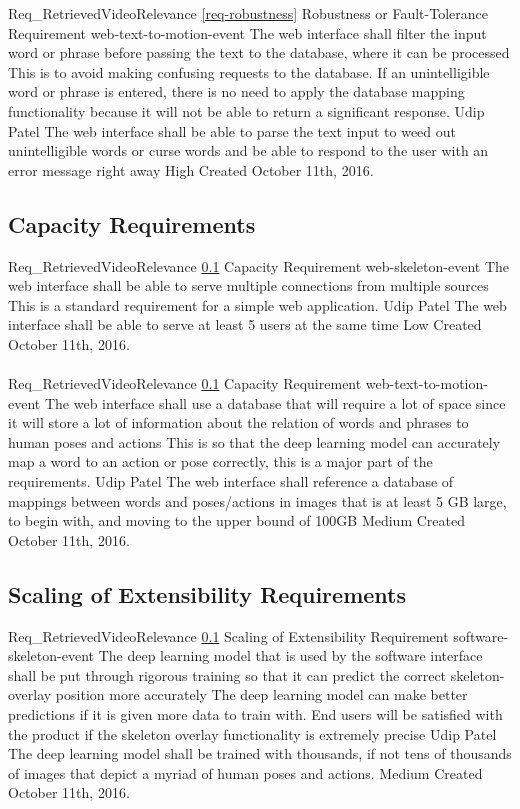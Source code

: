 \documentclass{scrreprt}
\begin{document}
\label{req-robustness}

\requirement
{Req_RetrievedVideoRelevance}
{\ref{req-robustness} Robustness or Fault-Tolerance Requirement}
{web-text-to-motion-event}
{The web interface shall filter the input word or phrase before passing the text to the database, where it can be processed}
{This is to avoid making confusing requests to the database. If an unintelligible word or phrase is entered, there is no need to apply the database mapping functionality because it will not be able to return a significant response.}
{Udip Patel}
{The web interface shall be able to parse the text input to weed out unintelligible words or curse words and be able to respond to the user with an error message right away }
{High}
{Created October 11th, 2016.}

\subsection{Capacity Requirements}
\label{req-capacity}

\requirement
{Req_RetrievedVideoRelevance}
{\ref{req-capacity} Capacity Requirement}
{web-skeleton-event}
{The web interface shall be able to serve multiple connections from multiple sources}
{This is a standard requirement for a simple web application.}
{Udip Patel}
{The web interface shall be able to serve at least 5 users at the same time}
{Low}
{Created October 11th, 2016.}
\\ \\

\requirement
{Req_RetrievedVideoRelevance}
{\ref{req-capacity} Capacity Requirement}
{web-text-to-motion-event}
{The web interface shall use a database that will require a lot of space since it will store a lot of information about the relation of words and phrases to human poses and actions}
{This is so that the deep learning model can accurately map a word to an action or pose correctly, this is a major part of the requirements.}
{Udip Patel}
{The web interface shall reference a database of mappings between words and poses/actions in images that is at least 5 GB large, to begin with, and moving to the upper bound of 100GB}
{Medium}
{Created October 11th, 2016.}


\subsection{Scaling of Extensibility Requirements}
\label{req-scaling}

\requirement
{Req_RetrievedVideoRelevance}
{\ref{req-capacity} Scaling of Extensibility Requirement}
{software-skeleton-event}
{The deep learning model that is used by the software interface shall be put through rigorous training so that it can predict the correct skeleton-overlay position more accurately}
{The deep learning model can make better predictions if it is given more data to train with. End users will be satisfied with the product if the skeleton overlay functionality is extremely precise}
{Udip Patel}
{The deep learning model shall be trained with thousands, if not tens of thousands of images that depict a myriad of human poses and actions.}
{Medium}
{Created October 11th, 2016.}
\end{document}
